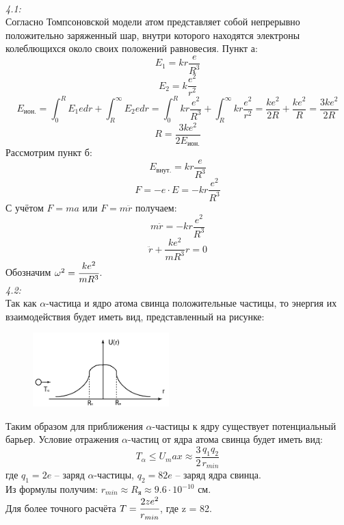 




	
	\emph{}\\

	\emph{4.1:}\\

	Согласно Томпсоновской модели атом представляет собой непрерывно положительно 
	заряженный шар, внутри которого находятся электроны колеблющихся около своих
	положений равновесия.
	Пункт а: \\
		\[ E_1 = kr\frac{e}{R^3} \]
		\[ E_2 = k\frac{e^2}{r^2} \]
		\[ 
			E_\text{ион.} = \int^R_0 E_1 e dr + \int^\infty_R E_2 e dr = 
			\int^R_0 kr\frac{e^2}{R^3} + \int^\infty_R kr\frac{e^2}{r^2} =
			\frac{ke^2}{2R} + \frac{ke^2}{R} = \frac{3ke^2}{2R}
		\]
		\[
			R = \frac{3ke^2}{2E_\text{ион.}}
		\]
	Рассмотрим пункт б: \\
		\[ E_{внут.} = kr\frac{e}{R^3} \]
		\[ F = -e\cdot E = -kr\frac{e^2}{R^3} \]
	С учётом \( F = ma \) или \( F = m\ddot{r} \) получаем:
		\[ m\ddot{r} = -kr\frac{e^2}{R^3} \]
		\[ \ddot{r} + \frac{ke^2}{mR^3}r = 0 \]
	Обозначим \( \omega^2 = \cfrac{ke^2}{mR^3} \). \\

	\emph{4.2:}\\

	Так как \( \alpha \)-частица и ядро атома свинца положительные частицы, то
	энергия их взаимодействия будет иметь вид, представленный на рисунке:

	\begin{figure}[b!]
	    \center
	    \includegraphics[width=0.47\textwidth]{4_2.pdf}
	\end{figure}

	Таким образом для приближения \( \alpha \)-частицы к ядру существует потенциальный
	барьер. Условие отражения \( \alpha \)-частиц от ядра атома свинца будет иметь вид:
		\[ T_\alpha \leq U_max \approx \frac{3}{2}\frac{q_1 q_2}{r_{min}} \]
	где \( q_1 = 2e \) -- заряд \( \alpha \)-частицы, \( q_2 = 82e \) -- заряд ядра свинца. \\
	Из формулы получим: \( r_{min} \approx R_\text{я} \approx 9.6\cdot10^{-10} \) см. \\
	Для более точного расчёта \( T = \cfrac{2ze^2}{r_{min}} \), где z = 82.\\

